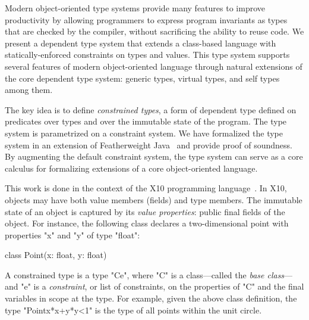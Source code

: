 




Modern object-oriented type systems provide 
many features to improve productivity by 
allowing programmers to express program
invariants as types that are
checked by the compiler, without sacrificing the ability to
reuse code.
We present a dependent type system
that extends a class-based language with
statically-enforced constraints on types and values.
This type system 
supports several features of modern object-oriented 
language through natural extensions of the core dependent type
system: generic types, virtual types, and self types
among them.

The key idea is to define \emph{constrained types},
a form of dependent type
defined on predicates over types and over the immutable state of
the program.
The type system is parametrized on a constraint system.
We have formalized the type system in an extension of
Featherweight Java~\cite{FJ}
and provide proof of soundness.
By augmenting the default constraint system,
the type system can serve as a core calculus 
for formalizing extensions of a core object-oriented language. 

This work is done in the context of the X10
programming language~\cite{X10}.
In X10, objects may have both value members (fields)
and type members.
The immutable state of an object is captured by its
\emph{value properties}: public final fields of the object.
For instance, the following class declares a two-dimensional
point with properties \xcd"x" and \xcd"y" of type \xcd"float":
\begin{xten}
class Point(x: float, y: float) { }
\end{xten}

A constrained type is a type \xcd"C{e}", where \xcd"C" is a
class---called the \emph{base class}---and \xcd"e" is a
\emph{constraint}, or list of constraints, on the properties of
\xcd"C" and the final variables in scope at the type.
For example, given the above class definition,
the type \xcd"Point{x*x+y*y<1}" is the type of all
points within the unit circle.


